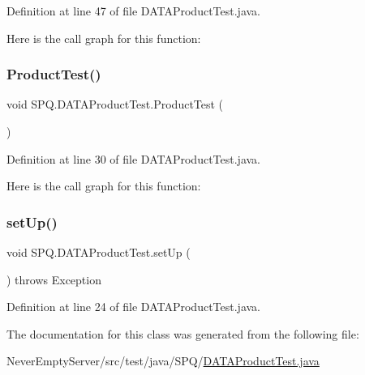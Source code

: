 Definition at line 47 of file D\+A\+T\+A\+Product\+Test.\+java.

Here is the call graph for this function\+:
\mbox{\label{class_s_p_q_1_1_d_a_t_a_product_test_afb49da7389a7f4f42159adf87b4a11be}} 
\subsubsection{\texorpdfstring{Product\+Test()}{ProductTest()}}
{\footnotesize\ttfamily void S\+P\+Q.\+D\+A\+T\+A\+Product\+Test.\+Product\+Test (\begin{DoxyParamCaption}{ }\end{DoxyParamCaption})}



Definition at line 30 of file D\+A\+T\+A\+Product\+Test.\+java.

Here is the call graph for this function\+:
\mbox{\label{class_s_p_q_1_1_d_a_t_a_product_test_a64e9238fb4b99af0cdf55768230b4c89}} 
\subsubsection{\texorpdfstring{set\+Up()}{setUp()}}
{\footnotesize\ttfamily void S\+P\+Q.\+D\+A\+T\+A\+Product\+Test.\+set\+Up (\begin{DoxyParamCaption}{ }\end{DoxyParamCaption}) throws Exception}



Definition at line 24 of file D\+A\+T\+A\+Product\+Test.\+java.



The documentation for this class was generated from the following file\+:\begin{DoxyCompactItemize}
\item 
Never\+Empty\+Server/src/test/java/\+S\+P\+Q/\mbox{\hyperlink{_d_a_t_a_product_test_8java}{D\+A\+T\+A\+Product\+Test.\+java}}\end{DoxyCompactItemize}
